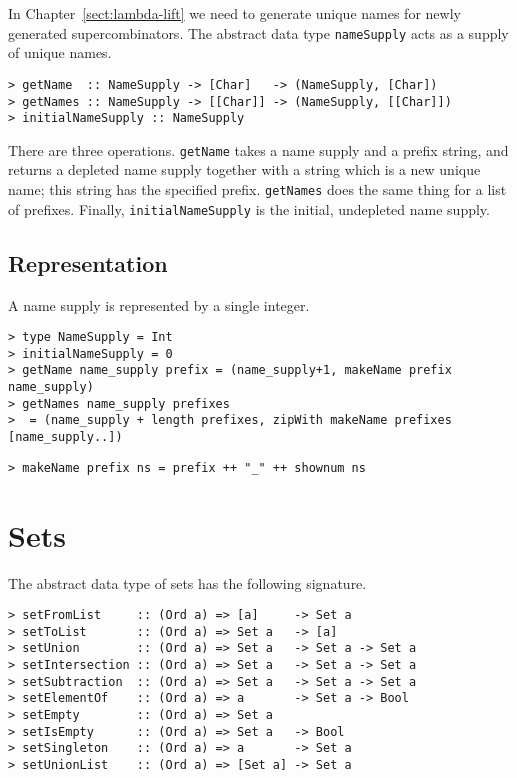 In Chapter~\ref{sect:lambda-lift} we need to generate unique
names
for newly generated supercombinators.  The abstract data type \mbox{\tt nameSupply}
acts as a supply of unique names.
\begin{verbatim}
> getName  :: NameSupply -> [Char]   -> (NameSupply, [Char])
> getNames :: NameSupply -> [[Char]] -> (NameSupply, [[Char]])
> initialNameSupply :: NameSupply
\end{verbatim}
%
%
%
There are three operations.  \mbox{\tt getName} takes a name supply and a prefix
string, and returns a depleted name supply together with a string which is
a new unique name; this string has the specified prefix.  \mbox{\tt getNames} does the
same thing for a list of prefixes.  Finally, \mbox{\tt initialNameSupply} is the
initial, undepleted name supply.

\subsection{Representation}

A name supply is represented by a single integer.
\begin{verbatim}
> type NameSupply = Int
> initialNameSupply = 0
> getName name_supply prefix = (name_supply+1, makeName prefix name_supply)
> getNames name_supply prefixes
>  = (name_supply + length prefixes, zipWith makeName prefixes [name_supply..])
\end{verbatim}
%
%
%
%
\begin{verbatim}
> makeName prefix ns = prefix ++ "_" ++ shownum ns
\end{verbatim}
%
\section{Sets}

\label{sect:set}

The abstract data type of sets has the following signature.
\begin{verbatim}
> setFromList     :: (Ord a) => [a]     -> Set a
> setToList       :: (Ord a) => Set a   -> [a]
> setUnion        :: (Ord a) => Set a   -> Set a -> Set a
> setIntersection :: (Ord a) => Set a   -> Set a -> Set a
> setSubtraction  :: (Ord a) => Set a   -> Set a -> Set a
> setElementOf    :: (Ord a) => a       -> Set a -> Bool
> setEmpty        :: (Ord a) => Set a
> setIsEmpty      :: (Ord a) => Set a   -> Bool
> setSingleton    :: (Ord a) => a       -> Set a
> setUnionList    :: (Ord a) => [Set a] -> Set a
\end{verbatim}
%
%
%
%
%
%
%
%
%
%

